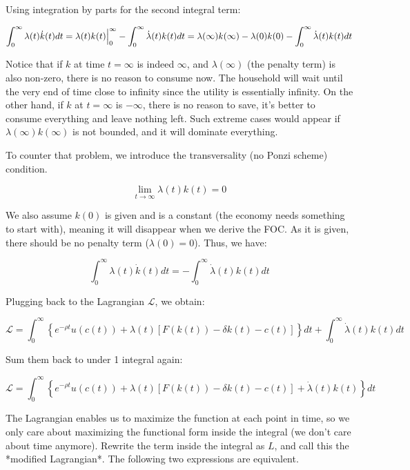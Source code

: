 \documentclass[11pt,a4paper]{book}
\theoremstyle{definition}\newtheorem{definition}{Definition}
\theoremstyle{definition}\newtheorem{fact}{Fact}
\theoremstyle{definition}\newtheorem{remark}{Remark}
\theoremstyle{definition}\newtheorem{ex}{Ex.}
\theoremstyle{definition}\newtheorem{project}{Project}
\theoremstyle{definition}\newtheorem{problem}{Problem}
\theoremstyle{definition}\newtheorem{example}{Example}
\numberwithin{theorem}{section}
\numberwithin{corollary}{chapter}
\numberwithin{assumption}{chapter}
\numberwithin{definition}{chapter}
\numberwithin{prop}{chapter}
\numberwithin{notation}{chapter}
\numberwithin{problem}{chapter}
\numberwithin{example}{chapter}
\numberwithin{fact}{chapter}
\numberwithin{ex}{chapter}
\begin{document}
Using integration by parts  for the second integral term:

$$
     \int_{0}^{\infty} \lambda(t) \dot{k}(t) dt                                               \\
     = \lambda(t) k(t) \Big|_0^\infty - \int_{0}^{\infty} \dot{\lambda}(t)k(t)dt              \\
     = \lambda(\infty) k(\infty) - \lambda(0) k(0) - \int_{0}^{\infty} \dot{\lambda}(t)k(t)dt 
$$

Notice that if $k$ at time $t=\infty$ is indeed $\infty$, and $\lambda(\infty)$ (the penalty term) is also non-zero, there is no reason to consume now. The household will wait until the very end of time close to infinity since the utility is essentially infinity. On the other hand, if $k$ at $t=\infty$ is $-\infty$, there is no reason to save, it's better to consume everything and leave nothing left. Such extreme cases would appear if $\lambda(\infty)k(\infty)$ is not bounded, and it will dominate everything.

To counter that problem, we introduce the transversality (no Ponzi scheme) condition.

$$
    \lim_{t\to\infty} \lambda(t)k(t) = 0
$$

We also assume $k(0)$ is given and is a constant (the economy needs something to start with), meaning it will disappear when we derive the FOC. As it is given, there should be no penalty term ($\lambda(0) = 0$). Thus, we have:

$$
    \int_{0}^{\infty} \lambda(t)\dot{k}(t) dt = - \int_{0}^{\infty} \dot{\lambda}(t) k(t) dt
$$

Plugging back to the Lagrangian $\mathcal{L}$, we obtain:

$$
    \mathcal{L} = \int_{0}^{\infty} \left\{ e^{-\rho t} u(c(t)) + \lambda(t) \left[ F( k(t)) - \delta k(t) - c(t)  \right] \right\} dt + \int_{0}^{\infty} \dot{\lambda}(t)k(t)dt 
$$

Sum them back to under 1 integral again:

$$
    \mathcal{L} = \int_{0}^{\infty} \left\{ e^{-\rho t} u(c(t)) + \lambda(t) \left[ F( k(t)) - \delta k(t) - c(t)  \right] +  \dot{\lambda}(t)k(t) \right\} dt 
$$

The Lagrangian enables us to maximize the function at each point in time, so we only care about maximizing the functional form inside the integral (we don't care about time anymore). Rewrite the term inside the integral as $L$, and call this the *modified Lagrangian*. The following two expressions are equivalent.
\end{document}
